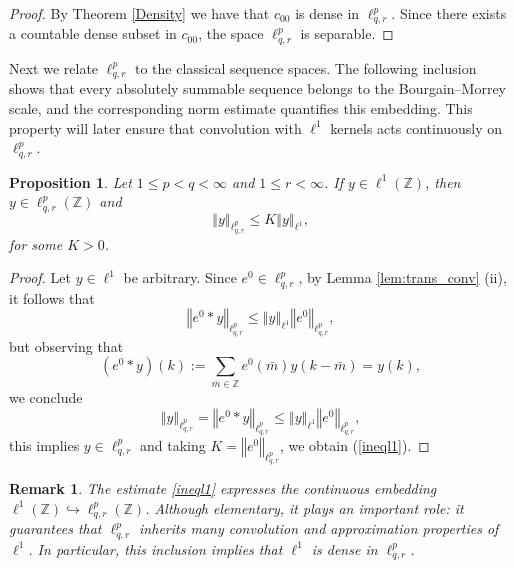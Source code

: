 \documentclass[preprint,12pt]{elsarticle}
\newtheorem{proposition}[theorem]{Proposition}
\newtheorem{remark}[theorem]{Remark}
\begin{document}
\begin{proof}
By Theorem \ref{Density} we have that $c_{00}$ is dense in $\ell^p_{q,r}$. Since there exists a countable dense subset in $c_{00}$, the space $\ell^p_{q,r}$ is separable.
\end{proof}


Next we relate $\ell^{p}_{q,r}$ to the classical sequence spaces. 
The following inclusion shows that every absolutely summable sequence 
belongs to the Bourgain--Morrey scale, and the corresponding norm estimate 
quantifies this embedding. 
This property will later ensure that convolution with $\ell^1$ kernels 
acts continuously on $\ell^{p}_{q,r}$.

\begin{proposition}\label{contencion}
Let $1\leq p<q<\infty$ and $1\leq r< \infty$. If $y\in \ell^{1}(\mathbb{Z})$, then $y\in \ell^{p}_{q,r}(\mathbb{Z})$ and
\begin{equation}\label{ineql1}
    \left\Vert  y\right\Vert _{\ell^{p}_{q,r}}\leq K\left\Vert y\right\Vert
_{\ell^{1}},
\end{equation}
for some $K>0$.
\end{proposition}

\begin{proof}
    Let $y\in \ell^{1}$ be arbitrary.  Since $e^{0}\in \ell^{p}_{q,r}$, by Lemma \ref{lem:trans_conv} (ii),
    it follows that
    \begin{equation*}
       \left\Vert e^{0}\ast y\right\Vert _{\ell^{p}_{q,r}}\leq\left\Vert y\right\Vert
_{\ell^{1}}\left\Vert e^{0}\right\Vert _{\ell^{p}_{q,r}} ,
    \end{equation*}
but observing that
\begin{equation*}
    (e^{0}\ast y)(k):=\sum_{\bar{m} \in \mathbb{Z}}e^{0}(\bar{m})y(k-\bar{m})=y(k),
\end{equation*}
we conclude 
 \begin{equation*}
       \left\Vert y\right\Vert _{\ell^{p}_{q,r}}=\left\Vert e^{0}\ast y\right\Vert _{\ell^{p}_{q,r}}\leq\left\Vert y\right\Vert
_{\ell^{1}}\left\Vert e^{0}\right\Vert _{\ell^{p}_{q,r}} ,
    \end{equation*}
this implies  $y\in \ell^{p}_{q,r}$ and taking $K=\left\Vert e^{0}\right\Vert _{\ell^{p}_{q,r}}$, we obtain (\ref{ineql1}).
\end{proof}
\begin{remark}
The estimate \eqref{ineql1} expresses the continuous embedding 
$\ell^{1}(\mathbb{Z})\hookrightarrow \ell^{p}_{q,r}(\mathbb{Z})$. 
Although elementary, it plays an important role: 
it guarantees that $\ell^{p}_{q,r}$ inherits many 
convolution and approximation properties of $\ell^{1}$. 
In particular, this inclusion implies that $\ell^{1}$ 
is dense in $\ell^{p}_{q,r}$.
\end{remark}
\end{document}

